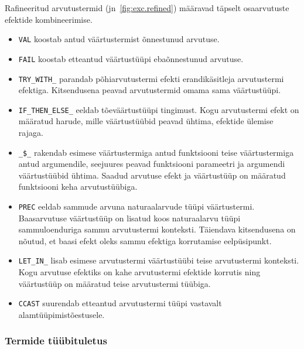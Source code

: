 \documentclass[a4paper,12pt]{article}
\begin{document}
Rafineeritud arvutustermid (jn~\ref{fig:exc.refined}) määravad täpselt osaarvutuste efektide kombineerimise.
\begin{itemize}
\item {\tt VAL} koostab antud väärtustermist õnnestunud arvutuse.
\item {\tt FAIL} koostab etteantud väärtustüüpi ebaõnnestunud arvutuse.
\item {\tt TRY_WITH_} parandab põhiarvutustermi efekti erandikäsitleja arvutustermi efektiga. Kitsendusena peavad arvutustermid omama sama väärtustüüpi.
\item {\tt IF_THEN_ELSE_} eeldab tõeväärtustüüpi tingimust. Kogu arvutustermi efekt on määratud harude, mille väärtustüübid peavad ühtima, efektide ülemise rajaga.
\item {\tt _\$_} rakendab esimese väärtustermiga antud funktsiooni teise väärtustermiga antud argumendile, seejuures peavad funktsiooni parameetri ja argumendi väärtustüübid ühtima. Saadud arvutuse efekt ja väärtustüüp on määratud funktsiooni keha arvutustüübiga. 
\item {\tt PREC} eeldab sammude arvuna naturaalarvude tüüpi väärtustermi. Baasarvutuse väärtustüüp on lisatud koos naturaalarvu tüüpi sammuloenduriga sammu arvutustermi konteksti. Täiendava kitsendusena on nõutud, et baasi efekt oleks sammu efektiga korrutamise eelpüsipunkt.
\item {\tt LET_IN_} lisab esimese arvutustermi väärtustüübi teise arvutustermi konteksti. Kogu arvutuse efektiks on kahe arvutustermi efektide korrutis ning väärtustüüp on määratud teise arvutustermi tüübiga.
\item {\tt CCAST} suurendab etteantud arvutustermi tüüpi vastavalt alamtüüpimistõestusele.
\end{itemize}


\subsubsection{Termide tüübituletus}\label{sssec:exc.infer-type}
\end{document}

